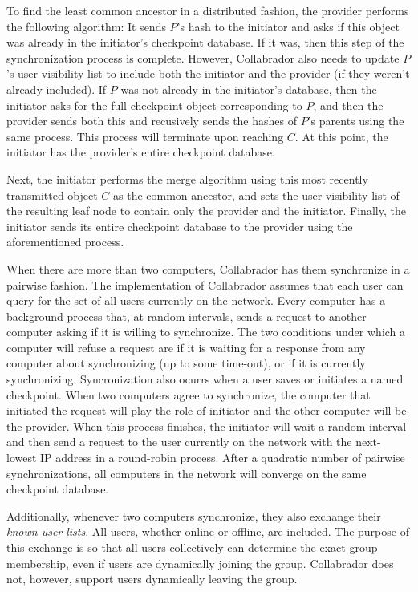 \documentclass[11pt,titlepage]{article}
\begin{document}
To find the least common ancestor in a distributed fashion, the
provider performs the following algorithm: It sends $P$'s hash to the
initiator and asks if this object was already in the initiator's
checkpoint database. If it was, then this step of the synchronization
process is complete. However, Collabrador also needs to update $P$'s
user visibility list to include both the initiator and the provider
(if they weren't already included). If $P$ was not already in the
initiator's database, then the initiator asks for the full checkpoint
object corresponding to $P$, and then the provider sends both this and
recusively sends the hashes of $P$'s parents using the same
process. This process will terminate upon reaching $C$. At this point,
the initiator has the provider's entire checkpoint database.

Next, the initiator performs the merge algorithm using this most
recently transmitted object $C$ as the common ancestor, and sets the
user visibility list of the resulting leaf node to contain only the
provider and the initiator. Finally, the initiator sends its entire
checkpoint database to the provider using the aforementioned process.

When there are more than two computers, Collabrador has them
synchronize in a pairwise fashion. The implementation of Collabrador
assumes that each user can query for the set of all users currently on
the network. Every computer has a background process that, at random
intervals, sends a request to another computer asking if it is willing
to synchronize.  The two conditions under which a computer will refuse
a request are if it is waiting for a response from any computer about
synchronizing (up to some time-out), or if it is currently
synchronizing. Syncronization also ocurrs when a user saves or initiates
a named checkpoint. When two computers agree to synchronize, the computer
that initiated the request will play the role of initiator and the
other computer will be the provider. When this process finishes, the
initiator will wait a random interval and then send a request to
the user currently on the network with the next-lowest IP address in a
round-robin process. After a quadratic number of pairwise
synchronizations, all computers in the network will converge on the
same checkpoint database.

Additionally, whenever two computers synchronize, they also exchange
their \emph{known user lists}. All users, whether online or offline,
are included. The purpose of this exchange is so that all users
collectively can determine the exact group membership, even if users
are dynamically joining the group. Collabrador does not, however,
support users dynamically leaving the group.
\end{document}
